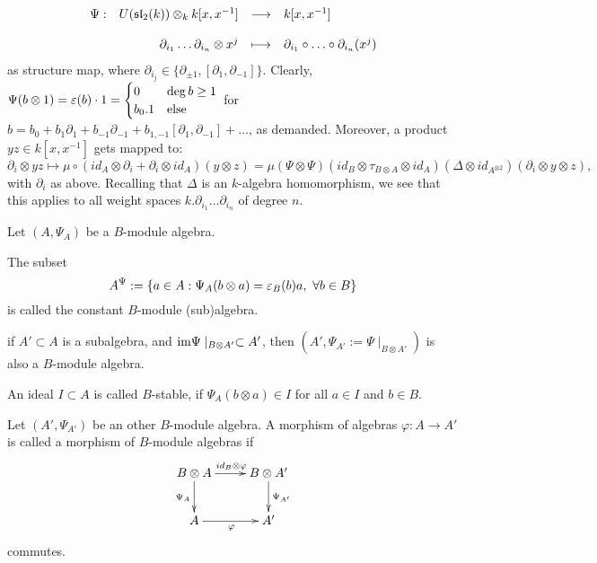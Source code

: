 $$\bao{rrcl}
\Psi : & U(\mathfrak{sl}_2(k)) \otimes_k k[x,x^{-1}] &\longrightarrow& k[x,x^{-1}]\\
&&&\\
& \partial_{i_1} \ldots \partial_{i_n} \otimes x^j & \longmapsto & \partial_{i_1} \circ \ldots \circ \partial_{i_n}(x^j)\\
\ea$$
as structure map, where $\partial_{i_j} \in \{\partial_{\pm 1}, [\partial_1,\partial_{-1}]\}$. Clearly, $\Psi(b \otimes 1) = \eps(b)\cdot 1 = \begin{cases}0 & \deg b \geq 1\\b_0.1 & \trm{else}\\\end{cases}$ for $b = b_0 + b_1 \partial_1 + b_{-1} \partial_{-1} + b_{1,-1} [\partial_1,\partial_{-1}] + \ldots$, as demanded. Moreover, a product $y z \in k[x,x^{-1}]$ gets mapped to:
$$\partial_{i} \otimes y z \longmapsto \mu \circ (id_A \otimes \partial_i + \partial_i \otimes id_A)(y \otimes z) = \mu(\Psi \otimes \Psi)(id_B \otimes \tau_{B \otimes A} \otimes id_A)(\Delta \otimes id_{A^{\otimes 2}})(\partial_i \otimes y \otimes z),$$
with $\partial_i$ as above. Recalling that $\Delta$ is an $k$-algebra homomorphism, we see that this applies to all weight spaces $k.\partial_{i_1} \ldots \partial_{i_n}$ of degree $n$.
\begin{defi}
Let $(A,\Psi_A)$ be a $B$-module algebra. 
\bn
\item The subset
$$A^\Psi := \{a \in A : \Psi_A(b \otimes a) = \eps_B(b) a,\ \forall b \in B\}$$
is called the constant $B$-module (sub)algebra.
\item if $A' \subset A$ is a subalgebra, and $\trm{im}\Psi\mid_{B\otimes A'} \subset A'$, then $(A', \Psi_{A'} := \Psi\mid_{B\otimes A'})$ is also a $B$-module algebra.
\item An ideal $I \subset A$ is called $B$-stable, if $\Psi_A(b \otimes a) \in I$ for all $a \in I$ and $b \in B$.
\item Let $(A',\Psi_{A'})$ be an other $B$-module algebra. A morphism of algebras $\varphi : A \longrightarrow A'$ is called a morphism of $B$-module algebras if
$$\xymatrix{
B \otimes A \ar[r]^{id_B\otimes \varphi}\ar[d]_{\Psi_A} & B \otimes A'\ar[d]^{\Psi_{A'}}\\
A \ar[r]_{\varphi} & A'\\
}$$
commutes.
\en
{}
\end{defi}
